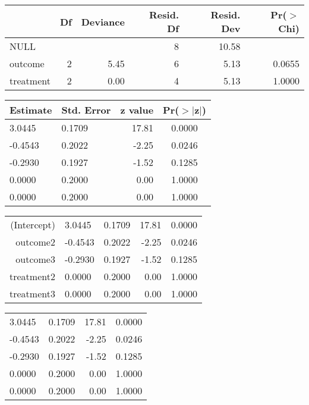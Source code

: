 \begin{table}[ht]
\centering
\begin{tabular}{lrrrrr}
  \hline
 & Df & Deviance & Resid. Df & Resid. Dev & Pr($>$Chi) \\ 
  \hline
NULL &  &  & 8 & 10.58 &  \\ 
  outcome & 2 & 5.45 & 6 & 5.13 & 0.0655 \\ 
  treatment & 2 & 0.00 & 4 & 5.13 & 1.0000 \\ 
   \hline
\end{tabular}
\end{table}
\begin{table}[ht]
\centering
\begin{tabular}{|llrc}
  \hline
Estimate & Std. Error & z value & Pr($>$$|$z$|$) \\ 
  \hline
3.0445 & 0.1709 & 17.81 & 0.0000 \\ 
  -0.4543 & 0.2022 & -2.25 & 0.0246 \\ 
  -0.2930 & 0.1927 & -1.52 & 0.1285 \\ 
  0.0000 & 0.2000 & 0.00 & 1.0000 \\ 
  0.0000 & 0.2000 & 0.00 & 1.0000 \\ 
   \hline
\end{tabular}
\end{table}
\begin{table}[ht]
\centering
\begin{tabular}{r||llrc}
  \hline
  \hline
(Intercept) & 3.0445 & 0.1709 & 17.81 & 0.0000 \\ 
  outcome2 & -0.4543 & 0.2022 & -2.25 & 0.0246 \\ 
  outcome3 & -0.2930 & 0.1927 & -1.52 & 0.1285 \\ 
  treatment2 & 0.0000 & 0.2000 & 0.00 & 1.0000 \\ 
  treatment3 & 0.0000 & 0.2000 & 0.00 & 1.0000 \\ 
   \hline
\end{tabular}
\end{table}
\begin{table}[ht]
\centering
\begin{tabular}{||llrc}
  \hline
  \hline
3.0445 & 0.1709 & 17.81 & 0.0000 \\ 
  -0.4543 & 0.2022 & -2.25 & 0.0246 \\ 
  -0.2930 & 0.1927 & -1.52 & 0.1285 \\ 
  0.0000 & 0.2000 & 0.00 & 1.0000 \\ 
  0.0000 & 0.2000 & 0.00 & 1.0000 \\ 
   \hline
\end{tabular}
\end{table}
